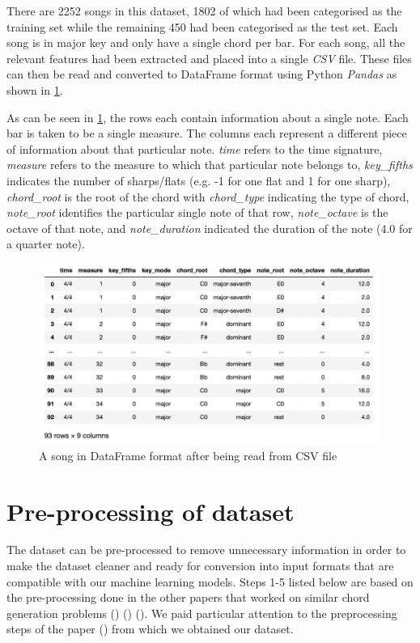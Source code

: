 There are 2252 songs in this dataset, 1802 of which had been categorised as the training set while the remaining 450 had been categorised as the test set. Each song is in major key and only have a single chord per bar. For each song, all the relevant features had been extracted and placed into a single \emph{CSV} file. These files can then be read and converted to DataFrame format using Python \emph{Pandas} as shown in \cref{fig:CSV_DF}.

As can be seen in \cref{fig:CSV_DF}, the rows each contain information about a single note. Each bar is taken to be a single measure. The columns each represent a different piece of information about that particular note. \emph{time} refers to the time signature, \emph{measure} refers to the measure to which that particular note belongs to, \emph{key\_fifths} indicates the number of sharps/flats (e.g. -1 for one flat and 1 for one sharp), \emph{chord\_root} is the root of the chord with \emph{chord\_type} indicating the type of chord, \emph{note\_root} identifies the particular single note of that row, \emph{note\_octave} is the octave of that note, and \emph{note\_duration} indicated the duration of the note (4.0 for a quarter note).

\begin{figure}
\centering
\includegraphics{Figures/CSV dataframe}
\decoRule
\caption{A song in DataFrame format after being read from CSV file}
\label{fig:CSV_DF}
\end{figure}

\section{Pre-processing of dataset}
\label{preprocessing}

The dataset can be pre-processed to remove unnecessary information in order to make the dataset cleaner and ready for conversion into input formats that are compatible with our machine learning models. Steps 1-5 listed below are based on the pre-processing done in the other papers that worked on similar chord generation problems (\cite{MySong}) (\cite{BLSTM}) (\cite{MLForChords}). We paid particular attention to the preprocessing steps of the paper (\cite{BLSTM}) from which we obtained our dataset.

